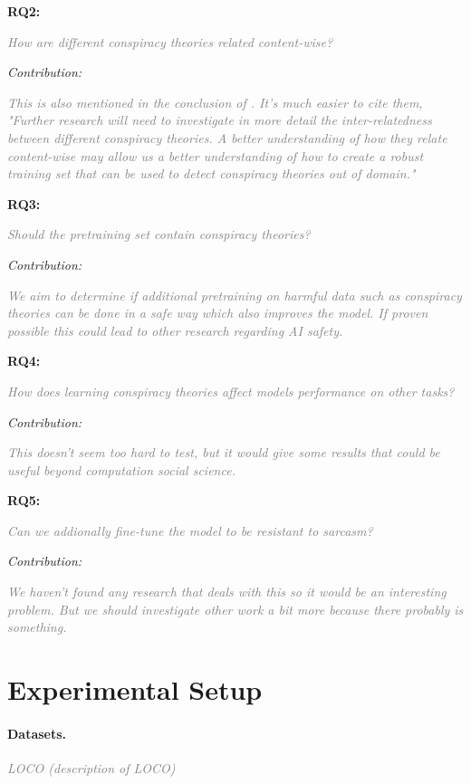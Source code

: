 \documentclass[11pt, a4paper]{article}
\newif\ifinstructions
\newcommand{\explain}[1]{%
  \ifinstructions
    \par\vspace{2pt}%
    {\small\color{exgray} #1}%
    \par\vspace{2pt}%
  \fi
}
\newcommand{\example}[1]{%
  \ifinstructions
    \par\vspace{1pt}%
    {\small\color{exblue} #1}%
    \par\vspace{4pt}%
  \fi
}
\newcommand{\fillhere}[1]{%
  \par\vspace{2pt}%
  \textit{\textcolor{gray}{#1}}%
  \par\vspace{2pt}%
}
\begin{document}
{\noindent\textbf{RQ2:} 
\fillhere{
How are different conspiracy theories related content-wise?}
\textit{Contribution:}
\fillhere{
This is also mentioned in the conclusion of \citep{fort2023bigfoot}. 
It's much easier to cite them, "Further research will need to investigate in more
detail the inter-relatedness between different 
conspiracy theories. A better understanding of how
they relate content-wise may allow us a better 
understanding of how to create a robust training set
that can be used to detect conspiracy theories out
of domain."
}

\noindent\textbf{RQ3:} \fillhere{
Should the pretraining set contain conspiracy theories?
}
\textit{Contribution:} \fillhere{
We aim to determine if additional pretraining on harmful data such as
conspiracy theories can be done in a safe way which also improves the model.
If proven possible this could lead to other research regarding AI safety.}

\noindent\textbf{RQ4:} \fillhere{
How does learning conspiracy theories affect models performance on other tasks?
}
\textit{Contribution:} \fillhere{
This doesn't seem too hard to test, but it would give some results that could be
useful beyond computation social science.
}

\noindent\textbf{RQ5:} \fillhere{
Can we addionally fine-tune the model to be resistant to sarcasm?
}
\textit{Contribution:} \fillhere{
We haven't found any research that deals with this so it would be an interesting problem.
But we should investigate other work a bit more because there probably is something.
}


\section{Experimental Setup}

\explain{Briefly describe your experimental plan across the four areas below. Each choice must be \textbf{justified} with respect to your RQs. For example,  saying ``we will use BERT'' without explaining why teaches nothing. This section should be concrete enough to show the pipeline is feasible, but you do not need a full methods section. Close with a short paragraph on risks.}

\paragraph{Datasets.}
\explain{What data will you use? Is it publicly available? Describe its key characteristics (size, domain, language, annotation scheme). If you plan to collect or synthesize data, briefly explain how.}
\example{``We will use the WikiAnn dataset \citep{pan2017wikiann}, which provides NER annotations for 176 languages including all seven target Slavic languages. It is publicly available, large-scale, and has been used as a standard benchmark in prior cross-lingual transfer work \citep{hu2020xtreme, lauscher2020zero}, making our results directly comparable.''}
\fillhere{LOCO (description of LOCO)}

}
\end{document}
